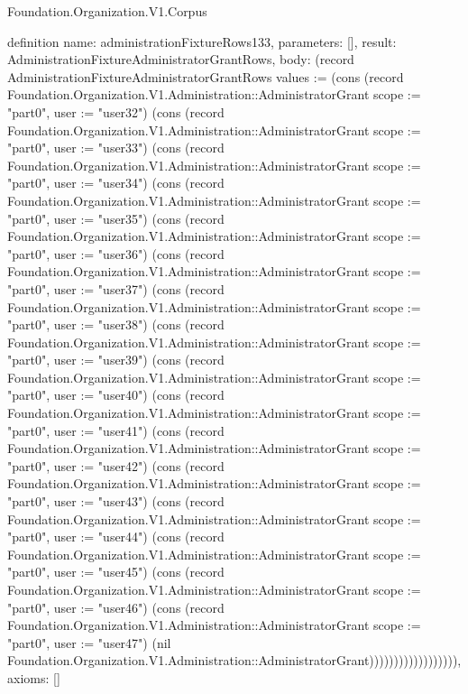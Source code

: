 \begin{lexlean}{Foundation.Organization.V1.Corpus}
\begin{semanticmodule}
definition{
  name: administrationFixtureRows133,
  parameters: [],
  result: AdministrationFixtureAdministratorGrantRows,
  body: (record AdministrationFixtureAdministratorGrantRows {values := (cons (record Foundation.Organization.V1.Administration::AdministratorGrant {scope := "part0", user := "user32"}) (cons (record Foundation.Organization.V1.Administration::AdministratorGrant {scope := "part0", user := "user33"}) (cons (record Foundation.Organization.V1.Administration::AdministratorGrant {scope := "part0", user := "user34"}) (cons (record Foundation.Organization.V1.Administration::AdministratorGrant {scope := "part0", user := "user35"}) (cons (record Foundation.Organization.V1.Administration::AdministratorGrant {scope := "part0", user := "user36"}) (cons (record Foundation.Organization.V1.Administration::AdministratorGrant {scope := "part0", user := "user37"}) (cons (record Foundation.Organization.V1.Administration::AdministratorGrant {scope := "part0", user := "user38"}) (cons (record Foundation.Organization.V1.Administration::AdministratorGrant {scope := "part0", user := "user39"}) (cons (record Foundation.Organization.V1.Administration::AdministratorGrant {scope := "part0", user := "user40"}) (cons (record Foundation.Organization.V1.Administration::AdministratorGrant {scope := "part0", user := "user41"}) (cons (record Foundation.Organization.V1.Administration::AdministratorGrant {scope := "part0", user := "user42"}) (cons (record Foundation.Organization.V1.Administration::AdministratorGrant {scope := "part0", user := "user43"}) (cons (record Foundation.Organization.V1.Administration::AdministratorGrant {scope := "part0", user := "user44"}) (cons (record Foundation.Organization.V1.Administration::AdministratorGrant {scope := "part0", user := "user45"}) (cons (record Foundation.Organization.V1.Administration::AdministratorGrant {scope := "part0", user := "user46"}) (cons (record Foundation.Organization.V1.Administration::AdministratorGrant {scope := "part0", user := "user47"}) (nil Foundation.Organization.V1.Administration::AdministratorGrant)))))))))))))))))}),
  axioms: []
}


\end{semanticmodule}
\end{lexlean}
